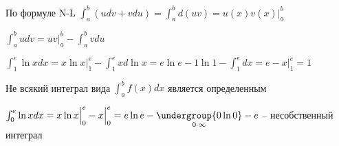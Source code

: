 \documentclass[12pt]{article}
\begin{document}
\begin{enumerate}[label*=\arabic** ]
\begin{MyProof}
            По формуле N-L $\int_a^b (udv + vdu) = \int^b_a d(uv) = u(x)v(x) \Big|^b_a$

            $\int_a^b udv = uv \Big|^b_a - \int^b_a vdu$
        \end{MyProof}

        \Ex $\int_1^e \ln x dx = x \ln x \Big|^e_1 - \int^e_1 xd\ln x = e \ln e - 1 \ln 1 -
        \int^e_1 dx = e - x \Big|_1^e = 1$

        \Nota Не всякий интеграл вида $\int^b_a f(x) dx $ является определенным

        \Ex $\int^e_0 \ln x dx = x \ln x \Big|_0^e - x \Big|_0^e = e \ln e - \underset{0 \cdot \infty}{\undergroup{0 \ln 0}} - e$ -- несобственный интеграл
    \end{enumerate}
\end{document}
